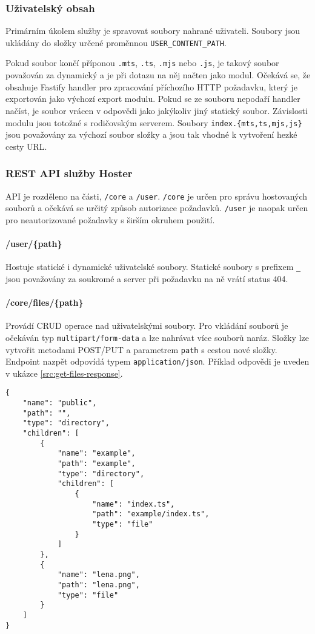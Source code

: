 \subsubsection{Uživatelský obsah}
Primárním úkolem služby je spravovat soubory nahrané uživateli. Soubory jsou ukládány do složky určené proměnnou \lstinline{USER_CONTENT_PATH}.

Pokud soubor končí příponou \lstinline|.mts|, \lstinline|.ts|, \lstinline|.mjs| nebo \lstinline|.js|, je takový soubor považován za dynamický a je při dotazu na něj načten jako modul. Očekává se, že obsahuje Fastify handler pro zpracování příchozího HTTP požadavku, který je exportován jako výchozí export modulu. Pokud se ze souboru nepodaří handler načíst, je soubor vrácen v odpovědi jako jakýkoliv jiný statický soubor. Závislosti modulu jsou totožné s rodičovským serverem. Soubory \lstinline|index.{mts,ts,mjs,js}| jsou považovány za výchozí soubor složky a jsou tak vhodné k vytvoření hezké cesty URL.

\subsubsection{REST API služby Hoster}
API je rozděleno na části, \lstinline|/core| a \lstinline|/user|. \lstinline|/core| je určen pro správu hostovaných souborů a očekává se určitý způsob autorizace požadavků. \lstinline|/user| je naopak určen pro neautorizované požadavky s širším okruhem použití.

\paragraph*{/user/\{path\}} Hostuje statické i dynamické uživatelské soubory. Statické soubory s prefixem \lstinline{_} jsou považovány za soukromé a server při požadavku na ně vrátí status 404.

\paragraph*{/core/files/\{path\}}
Provádí CRUD operace nad uživatelskými soubory. Pro vkládání souborů je očekáván typ \lstinline|multipart/form-data| a lze nahrávat více souborů naráz. Složky lze vytvořit metodami POST/PUT a parametrem \lstinline|path| s cestou nové složky. Endpoint nazpět odpovídá typem \lstinline|application/json|. Příklad odpovědi je uveden v ukázce \ref{src:get-files-response}.

\begin{lstlisting}[label=src:get-files-response,caption={Odpověď na dotaz GET /core/files/}]
{
    "name": "public",
    "path": "",
    "type": "directory",
    "children": [
        {
            "name": "example",
            "path": "example",
            "type": "directory",
            "children": [
                {
                    "name": "index.ts",
                    "path": "example/index.ts",
                    "type": "file"
                }
            ]
        },
        {
            "name": "lena.png",
            "path": "lena.png",
            "type": "file"
        }
    ]
}
\end{lstlisting}

